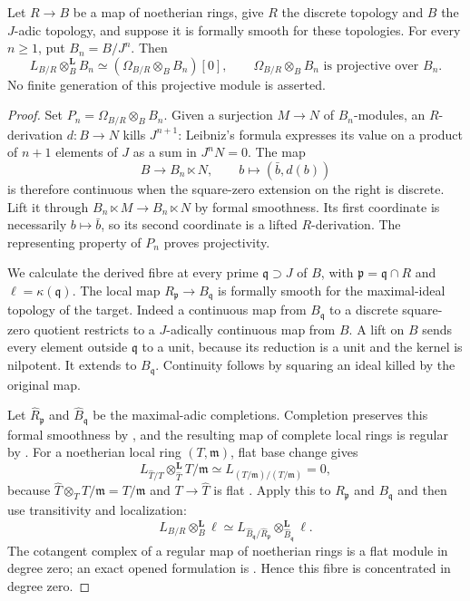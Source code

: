 \begin{lemma}
\label{SA23-A-14}
Let $R\to B$ be a map of noetherian rings, give $R$ the discrete
topology and $B$ the $J$-adic topology, and suppose it is formally
smooth for these topologies. For every $n\geq1$, put $B_n=B/J^n$.
Then
\[
 L_{B/R}\otimes_B^{\mathbf L}B_n
 \simeq(\Omega_{B/R}\otimes_B B_n)[0],
 \qquad \Omega_{B/R}\otimes_B B_n\text{ is projective over }B_n.
\]
No finite generation of this projective module is asserted.
\end{lemma}
\begin{proof}
Set $P_n=\Omega_{B/R}\otimes_B B_n$. Given a surjection $M\to N$
of $B_n$-modules, an $R$-derivation $d:B\to N$ kills $J^{n+1}$:
Leibniz's formula expresses its value on a product of $n+1$ elements
of $J$ as a sum in $J^nN=0$. The map
\[
 B\longrightarrow B_n\ltimes N,\qquad b\longmapsto(\bar b,d(b))
\]
is therefore continuous when the square-zero extension on the right
is discrete. Lift it through $B_n\ltimes M\to B_n\ltimes N$ by formal
smoothness. Its first coordinate is necessarily $b\mapsto\bar b$,
so its second coordinate is a lifted $R$-derivation. The representing
property of $P_n$ proves projectivity.

We calculate the derived fibre at every prime $\mathfrak q\supset J$
of $B$, with $\mathfrak p=\mathfrak q\cap R$ and
$\ell=\kappa(\mathfrak q)$. The local map
$R_{\mathfrak p}\to B_{\mathfrak q}$ is formally smooth for the
maximal-ideal topology of the target. Indeed a continuous map from
$B_{\mathfrak q}$ to a discrete square-zero quotient restricts to a
$J$-adically continuous map from $B$. A lift on $B$ sends every
element outside $\mathfrak q$ to a unit, because its reduction is a
unit and the kernel is nilpotent. It extends to $B_{\mathfrak q}$.
Continuity follows by squaring an ideal killed by the original map.

Let $\widehat R_{\mathfrak p}$ and $\widehat B_{\mathfrak q}$ be the
maximal-adic completions. Completion preserves this formal
smoothness by \cite[Lemma 15.38.4]{rootStacksFormalCompletion}, and
the resulting map of complete local rings is regular by
\cite[Proposition 15.50.2]{rootStacksAndre}.
For a noetherian local ring $(T,\mathfrak m)$, flat base change gives
\[
 L_{\widehat T/T}\otimes_{\widehat T}^{\mathbf L}T/\mathfrak m
 \simeq L_{(T/\mathfrak m)/(T/\mathfrak m)}=0,
\]
because $\widehat T\otimes_T T/\mathfrak m=T/\mathfrak m$ and
$T\to\widehat T$ is flat
\cite[Lemmas 10.97.2 and 92.6.2]{rootStacksNoetherianCompletion,rootStacksBaseChange}.
Apply this to $R_{\mathfrak p}$ and
$B_{\mathfrak q}$ and then use transitivity and localization:
\[
 L_{B/R}\otimes_B^{\mathbf L}\ell
 \simeq
 L_{\widehat B_{\mathfrak q}/\widehat R_{\mathfrak p}}
       \otimes_{\widehat B_{\mathfrak q}}^{\mathbf L}\ell .
\]
The cotangent complex of a regular map of noetherian rings is a flat
module in degree zero; an exact opened formulation is
\cite[Theorem 2.10]{rootBlickleFink2025}. Hence this fibre is
concentrated in degree zero.


\end{proof}
